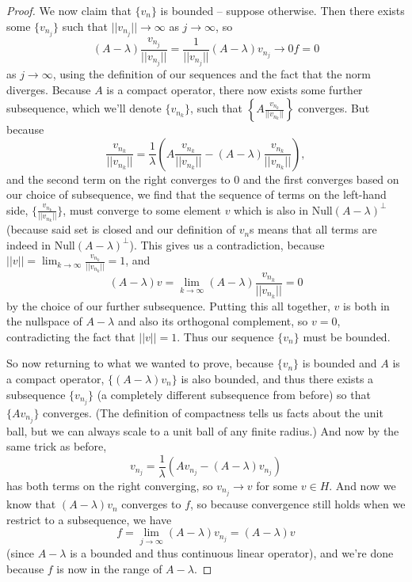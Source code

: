 \begin{proof}
We now claim that $\{v_n\}$ is bounded -- suppose otherwise. Then there exists some $\{v_{n_j}\}$ such that $||v_{n_j}|| \to \infty$ as $j \to \infty$, so
\[
    (A - \lambda) \frac{v_{n_j}}{||v_{n_j}||} = \frac{1}{||v_{n_j}||} (A - \lambda) v_{n_j} \to 0 f = 0
\]
as $j \to \infty$, using the definition of our sequences and the fact that the norm diverges. Because $A$ is a compact operator, there now exists some further subsequence, which we'll denote $\{v_{n_k}\}$, such that $\left\{A\frac{v_{n_k}}{||v_{n_k}||}\right\}$ converges. But because 
\[
    \frac{v_{n_k}}{||v_{n_k}||} = \frac{1}{\lambda} \left(A\frac{v_{n_k}}{||v_{n_k}||} - (A - \lambda) \frac{v_{n_k}}{||v_{n_k}||} \right),
\]
and the second term on the right converges to $0$ and the first converges based on our choice of subsequence, we find that the sequence of terms on the left-hand side, $\{ \frac{v_{n_k}}{||v_{n_k}||}\}$, must converge to some element $v$ which is also in $\text{Null}(A - \lambda)^\perp$ (because said set is closed and our definition of $v_n$s means that all terms are indeed in $\text{Null}(A - \lambda)^\perp$). This gives us a contradiction, because $||v|| = \lim_{k \to \infty}\frac{v_{n_k}}{||v_{n_k}||} = 1$, and 
\[
    (A - \lambda)v = \lim_{k \to \infty} (A - \lambda) \frac{v_{n_k}}{||v_{n_k}||} = 0
\]
by the choice of our further subsequence. Putting this all together, $v$ is both in the nullspace of $A - \lambda$ and also its orthogonal complement, so $v = 0$, contradicting the fact that $||v|| = 1$. Thus our sequence $\{v_n\}$ must be bounded. 

So now returning to what we wanted to prove, because $\{v_n\}$ is bounded and $A$ is a compact operator, $\{(A - \lambda)v_n\}$ is also bounded, and thus there exists a subsequence $\{v_{n_j}\}$ (a completely different subsequence from before) so that $\{Av_{n_j}\}$ converges. (The definition of compactness tells us facts about the unit ball, but we can always scale to a unit ball of any finite radius.) And now by the same trick as before, 
\[
    v_{n_j} = \frac{1}{\lambda} \left(Av_{n_j} - (A - \lambda)v_{n_j}\right)
\]
has both terms on the right converging, so $v_{n_j} \to v$ for some $v \in H$. And now we know that $(A - \lambda)v_{n}$ converges to $f$, so because convergence still holds when we restrict to a subsequence, we have
\[
    f = \lim_{j \to \infty} (A - \lambda)v_{n_j} = (A - \lambda)v
\]
(since $A - \lambda$ is a bounded and thus continuous linear operator), and we're done because $f$ is now in the range of $A - \lambda$.
\end{proof}

